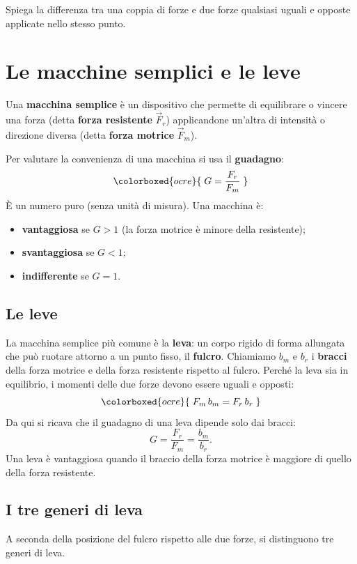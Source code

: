\begin{esercizio}
Spiega la differenza tra una coppia di forze e due forze qualsiasi uguali e opposte applicate nello stesso punto.\\
\end{esercizio}


\section{Le macchine semplici e le leve}

\begin{definizione}
Una \textbf{macchina semplice} è un dispositivo che permette di equilibrare o vincere una forza (detta \textbf{forza resistente} $\vec{F}_r$) applicandone un'altra di intensità o direzione diversa (detta \textbf{forza motrice} $\vec{F}_m$).
\end{definizione}

Per valutare la convenienza di una macchina si usa il \textbf{guadagno}:
\[
\colorboxed{ocre}{\; G = \frac{F_r}{F_m} \;}
\]
È un numero puro (senza unità di misura). Una macchina è:
\begin{itemize}
\item \textbf{vantaggiosa} se $G > 1$ (la forza motrice è minore della resistente);
\item \textbf{svantaggiosa} se $G < 1$;
\item \textbf{indifferente} se $G = 1$.
\end{itemize}

\subsection{Le leve}
La macchina semplice più comune è la \textbf{leva}: un corpo rigido di forma allungata che può ruotare attorno a un punto fisso, il \textbf{fulcro}. Chiamiamo $b_m$ e $b_r$ i \textbf{bracci} della forza motrice e della forza resistente rispetto al fulcro. Perché la leva sia in equilibrio, i momenti delle due forze devono essere uguali e opposti:
\[
\colorboxed{ocre}{\; F_m\,b_m = F_r\,b_r \;}
\]
Da qui si ricava che il guadagno di una leva dipende solo dai bracci:
\[
G = \frac{F_r}{F_m} = \frac{b_m}{b_r}.
\]
Una leva è vantaggiosa quando il braccio della forza motrice è maggiore di quello della forza resistente.

\subsection{I tre generi di leva}
A seconda della posizione del fulcro rispetto alle due forze, si distinguono tre generi di leva.

